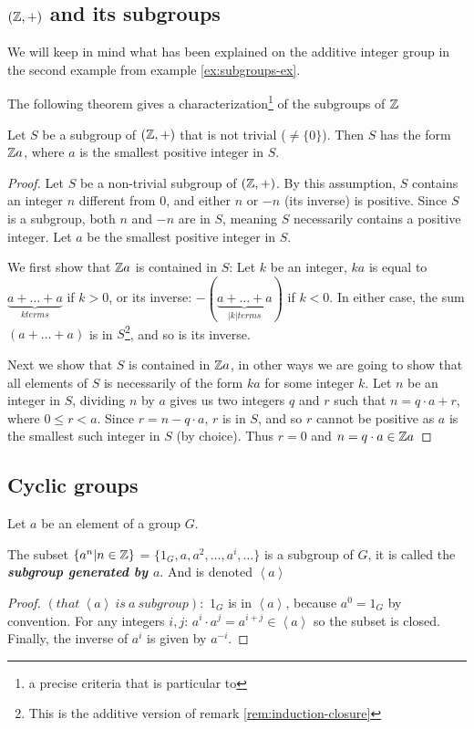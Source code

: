 \subsection{$(\Z, +)$ and its subgroups}
We will keep in mind what has been explained on the additive integer group in the second example from example \ref{ex:subgroups-ex}.

The following theorem gives a characterization\footnote{a precise criteria that is particular to} of the subgroups of $\mathbb{Z}$
\begin{boxedTheorem}[Subgroups of $(\Z, +)$]
    Let $S$ be a subgroup of $(\Z, +)$ that is not trivial ($\neq \{0\}$). Then $S$ has the form $\mathbb{Z} a$, where $a$ is the smallest positive integer in $S$.
\end{boxedTheorem}
\begin{proof}
    Let $S$ be a non-trivial subgroup of $(\Z, +)$. By this assumption, $S$ contains an integer $n$ different from $0$, and either $n$ or $-n$ (its inverse) is positive. Since $S$ is a subgroup, both $n$ and $-n$ are in $S$, meaning $S$ necessarily contains a positive integer. Let $a$ be the smallest positive integer in $S$.

    We first show that $\mathbb{Z} a$ is contained in $S$: Let $k$ be an integer, $ka$ is equal to $\underbrace{a + \hdots + a}_{k terms}$ if $k > 0$, or its inverse: $-(\underbrace{a + \hdots + a}_{|k| terms})$ if $k < 0$. In either case, the sum $(a + \hdots + a)$ is in $S$\footnote{This is the additive version of remark \ref{rem:induction-closure}}, and so is its inverse. 

    Next we show that $S$ is contained in $\mathbb{Z} a$, in other ways we are going to show that all elements of $S$ is necessarily of the form $ka$ for some integer $k$. Let $n$ be an integer in $S$, dividing $n$ by $a$ gives us two integers $q$ and $r$ such that $n = q\cdot a + r$, where $0 \leq r < a$. Since $r = n - q\cdot a$, $r$ is in $S$, and so $r$ cannot be positive as $a$  is the smallest such integer in $S$ (by choice). Thus $r = 0$ and $n = q\cdot a \in \mathbb{Z} a$
\end{proof}

\subsection{Cyclic groups}
Let $a$ be an element of a group $G$. 
\begin{boxedDefinition} \label{def:subgroup-generated-by-an-element}
    The subset $\{a^n | n \in \mathbb{Z}\}$ = $\{1_G, a, a^2, \hdots, a^i, \hdots\}$ is a subgroup of $G$, it is called the \textit{\textbf{subgroup generated by $a$}}. And is denoted $\left\langle a \right\rangle$
\end{boxedDefinition}
\begin{proof} $(that\ \left\langle a \right\rangle\ is\ a\ subgroup):$
    $1_G$ is in $\left\langle a \right\rangle$, because $a^0 = 1_G$ by convention. For any integers $i, j$: $a^i \cdot a^j = a^{i+j} \in \left\langle a \right\rangle$ so the subset is closed. Finally, the inverse of $a^i$ is given by $a^{-i}$.
\end{proof}

